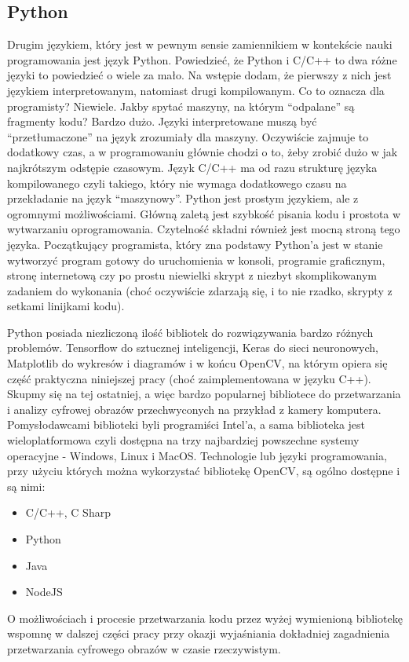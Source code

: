 \documentclass{article}
\begin{document}
	\subsection{Python}
	Drugim językiem, który jest w pewnym sensie zamiennikiem w kontekście nauki programowania jest język Python. Powiedzieć, że Python i C/C++ to dwa różne języki to powiedzieć o wiele za mało. Na wstępie dodam, że pierwszy z nich jest językiem interpretowanym, natomiast drugi kompilowanym. Co to oznacza dla programisty? Niewiele. Jakby spytać maszyny, na którym “odpalane” są fragmenty kodu? Bardzo dużo. Języki interpretowane muszą być “przetłumaczone” na język zrozumiały dla maszyny. Oczywiście zajmuje to dodatkowy czas, a w programowaniu głównie chodzi o to, żeby zrobić dużo w jak najkrótszym odstępie czasowym. Język C/C++ ma od razu strukturę języka kompilowanego czyli takiego, który nie wymaga dodatkowego czasu na przekładanie na język “maszynowy”. Python jest prostym językiem, ale z ogromnymi możliwościami. Główną zaletą jest szybkość pisania kodu i prostota w wytwarzaniu oprogramowania. Czytelność składni również jest mocną stroną tego języka. Początkujący programista, który zna podstawy Python’a jest w stanie wytworzyć program gotowy do uruchomienia w konsoli, programie graficznym, stronę internetową czy po prostu niewielki skrypt z niezbyt skomplikowanym zadaniem do wykonania (choć oczywiście zdarzają się, i to nie rzadko, skrypty z setkami linijkami kodu).
	\par
	Python posiada niezliczoną ilość bibliotek do rozwiązywania bardzo różnych problemów. Tensorflow do sztucznej inteligencji, Keras do sieci neuronowych, Matplotlib do wykresów i diagramów i w końcu OpenCV, na którym opiera się część praktyczna niniejszej pracy (choć zaimplementowana w języku C++). Skupmy się na tej ostatniej, a więc bardzo popularnej bibliotece do przetwarzania i analizy cyfrowej obrazów przechwyconych \linebreak na przykład z kamery komputera. Pomysłodawcami biblioteki byli programiści Intel’a, a sama biblioteka jest wieloplatformowa czyli dostępna na trzy najbardziej powszechne systemy operacyjne - Windows, Linux i MacOS. Technologie lub języki programowania, przy użyciu których można wykorzystać bibliotekę OpenCV, są ogólno dostępne i są nimi:
	\newpage
	\begin{itemize}
		\item C/C++, C Sharp
		\item Python
		\item Java
		\item NodeJS
	\end{itemize}
	O możliwościach i procesie przetwarzania kodu przez wyżej wymienioną bibliotekę wspomnę w dalszej części pracy przy okazji wyjaśniania dokładniej zagadnienia przetwarzania \linebreak cyfrowego obrazów w czasie rzeczywistym.
	
\end{document}
